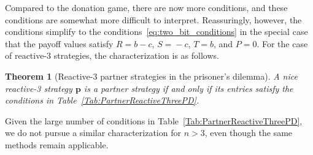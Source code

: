 \documentclass[11pt]{article}
\theoremstyle{plainCl1}
\newtheorem{theorem}{Theorem}
\theoremstyle{plainCl2}
\begin{document}
\noindent
Compared to the donation game, there are now more conditions, and these conditions are somewhat more difficult to interpret. Reassuringly, however, the conditions simplify to the conditions~\eqref{eq:two_bit_conditions} in the special case that the payoff values satisfy $R\!=\!b\!-\!c$, $S\!=\!-c$, $T\!=\!b$, and $P\!=\!0$. 
For the case of reactive-3 strategies, the characterization is as follows. 



\begin{theorem}[Reactive-3 partner strategies in the prisoner's dilemma]
\label{theorem:reactive_three_partner_strategies_PD}
A nice reactive-3 strategy $\mathbf{p}$ is a partner strategy if and only if its entries satisfy the conditions in Table~\ref{Tab:PartnerReactiveThreePD}. 
\end{theorem}

\noindent
Given the large number of conditions in Table~\ref{Tab:PartnerReactiveThreePD}, we do not pursue a similar characterization for $n\!>\!3$, even though the same methods remain applicable. \\
\end{document}
